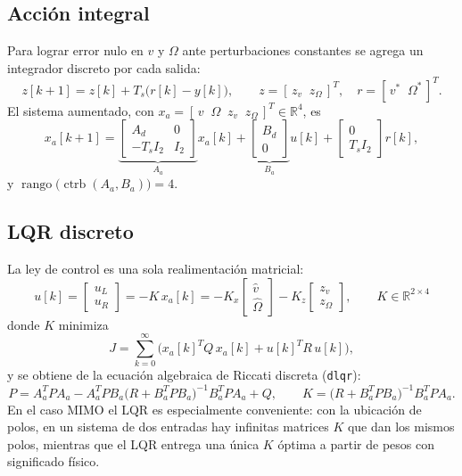 \documentclass[11pt,letterpaper]{article}
\newcommand{\R}{\mathbb{R}}
\begin{document}
\subsection{Acción integral}
Para lograr error nulo en $v$ y $\Omega$ ante perturbaciones constantes se agrega un integrador discreto por cada salida:
\begin{equation}
  z[k+1] = z[k] + T_s\big(r[k] - y[k]\big), \qquad z = [\,z_v\;\; z_\Omega\,]^T,\quad r = [\,v^*\;\;\Omega^*\,]^T .
\end{equation}
El sistema aumentado, con $x_a = [\,v\;\;\Omega\;\;z_v\;\;z_\Omega\,]^T \in \R^4$, es
\begin{equation}
  x_a[k+1] = \underbrace{\begin{bmatrix} A_d & 0 \\ -T_s I_2 & I_2 \end{bmatrix}}_{A_a} x_a[k] + \underbrace{\begin{bmatrix} B_d \\ 0 \end{bmatrix}}_{B_a} u[k] + \begin{bmatrix} 0 \\ T_s I_2 \end{bmatrix} r[k],
\end{equation}
y $\operatorname{rango}\big(\operatorname{ctrb}(A_a,B_a)\big) = 4$.

\subsection{LQR discreto}
La ley de control es una sola realimentación matricial:
\begin{equation}
  \boxed{\;u[k] = \begin{bmatrix} u_L \\ u_R \end{bmatrix} = -K\,x_a[k] = -K_x \begin{bmatrix} \hat v \\ \hat\Omega \end{bmatrix} - K_z \begin{bmatrix} z_v \\ z_\Omega \end{bmatrix},\qquad K \in \R^{2\times4}\;}
\end{equation}
donde $K$ minimiza
\begin{equation}
  J = \sum_{k=0}^{\infty} \Big( x_a[k]^T Q\, x_a[k] + u[k]^T R\, u[k] \Big),
\end{equation}
y se obtiene de la ecuación algebraica de Riccati discreta (\texttt{dlqr}):
\begin{equation}
  P = A_a^TPA_a - A_a^TPB_a\big(R + B_a^TPB_a\big)^{-1}B_a^TPA_a + Q, \qquad K = \big(R + B_a^TPB_a\big)^{-1}B_a^TPA_a .
\end{equation}
En el caso MIMO el LQR es especialmente conveniente: con la ubicación de polos, en un sistema de dos entradas hay infinitas matrices $K$ que dan los mismos polos, mientras que el LQR entrega una única $K$ óptima a partir de pesos con significado físico.
\end{document}

